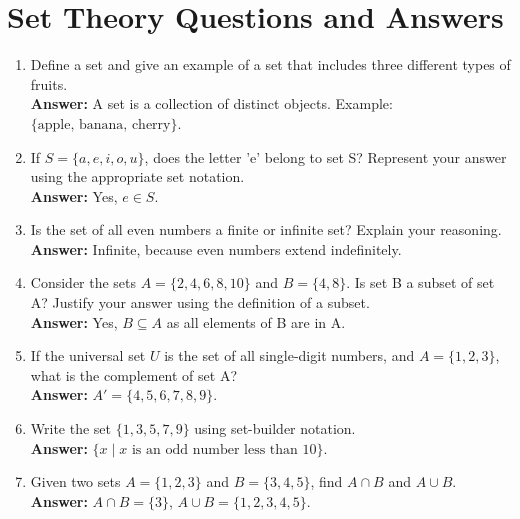 \documentclass{article}
\begin{document}
\section*{Set Theory Questions and Answers}

\begin{enumerate}
    \item Define a set and give an example of a set that includes three different types of fruits.\\
    \textbf{Answer:} A set is a collection of distinct objects. Example: \( \{ \text{apple, banana, cherry} \} \).\\[1em]

    \item If \( S = \{ a, e, i, o, u \} \), does the letter 'e' belong to set S? Represent your answer using the appropriate set notation.\\
    \textbf{Answer:} Yes, \( e \in S \).\\[1em]

    \item Is the set of all even numbers a finite or infinite set? Explain your reasoning.\\
    \textbf{Answer:} Infinite, because even numbers extend indefinitely.\\[1em]

    \item Consider the sets \( A = \{ 2, 4, 6, 8, 10 \} \) and \( B = \{ 4, 8 \} \). Is set B a subset of set A? Justify your answer using the definition of a subset.\\
    \textbf{Answer:} Yes, \( B \subseteq A \) as all elements of B are in A.\\[1em]

    \item If the universal set \( U \) is the set of all single-digit numbers, and \( A = \{ 1, 2, 3 \} \), what is the complement of set A?\\
    \textbf{Answer:} \( A' = \{ 4, 5, 6, 7, 8, 9 \} \).\\[1em]

    \item Write the set \( \{ 1, 3, 5, 7, 9 \} \) using set-builder notation.\\
    \textbf{Answer:} \( \{ x \mid x \text{ is an odd number less than } 10 \} \).\\[1em]

    \item Given two sets \( A = \{ 1, 2, 3 \} \) and \( B = \{ 3, 4, 5 \} \), find \( A \cap B \) and \( A \cup B \).\\
    \textbf{Answer:} \( A \cap B = \{ 3 \} \), \( A \cup B = \{ 1, 2, 3, 4, 5 \} \).\\[1em]


\end{enumerate}
\end{document}
